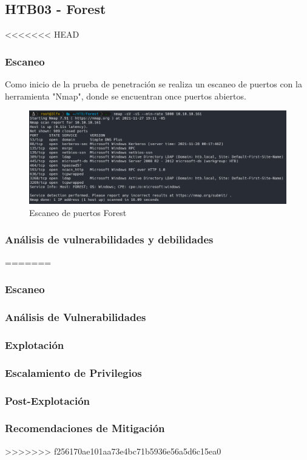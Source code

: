 \subsection{HTB03 - Forest}
<<<<<<< HEAD
    \subsubsection{Escaneo}
        \large{Como inicio de la prueba de penetración se realiza un escaneo de puertos con la herramienta "Nmap", donde se encuentran once puertos abiertos.}
        \par
        \begin{figure}[h!]
            \includegraphics[width=1\textwidth]{imagenes/nmap_forest.png} \par \vspace{0.1cm}
            \caption{Escaneo de puertos Forest} 
        \end{figure}
    \subsubsection{Análisis de vulnerabilidades y debilidades}
    
=======
\subsubsection{Escaneo}
\subsubsection{Análisis de Vulnerabilidades}
\subsubsection{Explotación}
\subsubsection{Escalamiento de Privilegios}
\subsubsection{Post-Explotación}
\subsubsection{Recomendaciones de Mitigación}
>>>>>>> f256170ae101aa73e4bc71b5936e56a5d6c15ea0
